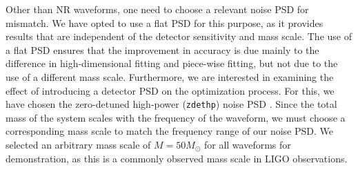 \documentclass[twocolumn]{aastex631}
\newcommand{\zdethp}{\texttt{zdethp}}
\newcommand{\te}[1]{{\color{rr}[TE: #1 ]}}
\begin{document}
Other than NR waveforms, one need to choose a relevant noise PSD for 
mismatch. We have opted to use a flat PSD for this purpose, as it provides results that are independent of the detector sensitivity and mass scale. The use of a flat PSD ensures that the improvement in accuracy is due mainly to the difference in high-dimensional fitting and piece-wise fitting, but not due to the use of a different mass scale. Furthermore, we are interested in examining the effect of introducing a detector PSD on the optimization process. For this, we have chosen the zero-detuned high-power (\zdethp) noise PSD \citep{aasi2015advanced}. Since the total mass of the system scales with the frequency of the waveform, we must choose a corresponding mass scale to match the frequency range of our noise PSD. We selected an arbitrary mass scale of $M=50M_{\odot}$ for all waveforms for demonstration, as this is a commonly observed mass scale in LIGO observations. 

\end{document}
